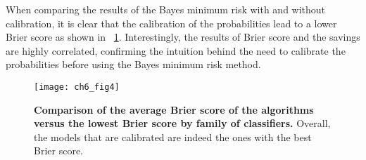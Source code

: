 When comparing the results of the Bayes minimum risk with and without calibration, it is clear that 
the calibration of the probabilities lead to a lower Brier score as shown in 
\figurename{~\ref{fig:6:comparison_family_brier}}. Interestingly, the results of Brier score 
and the savings are highly correlated, confirming the intuition behind the need to calibrate the 
probabilities before using the Bayes minimum risk method.

\begin{figure}[!t]
  \centering
  \texttt{[image: ch6\_fig4]}
  \caption{\textbf{Comparison of the average Brier score of the algorithms versus the 
    lowest Brier score by family of classifiers.} Overall, the models that are calibrated are 
indeed the ones with the best Brier score.}
  \label{fig:6:comparison_family_brier}
\end{figure}


  
  
  